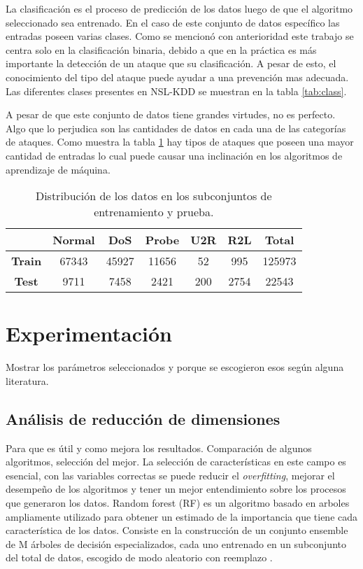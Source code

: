 La clasificación es el proceso de predicción de los datos luego de que el algoritmo seleccionado sea entrenado. En el caso de este conjunto de datos específico las entradas poseen varias clases. Como se mencionó con anterioridad este trabajo se centra solo en la clasificación binaria, debido a que en la práctica es más importante la detección de un ataque que su clasificación. A pesar de esto, el conocimiento del tipo del ataque puede ayudar a una prevención mas adecuada. Las diferentes clases presentes en NSL-KDD se muestran en la tabla \ref{tab:class}.


A pesar de que este conjunto de datos tiene grandes virtudes, no es perfecto. Algo que lo perjudica son las cantidades de datos en cada una de las categorías de ataques. Como muestra la tabla \ref{tab:atk_counts} hay tipos de ataques que poseen una mayor cantidad de entradas lo cual puede causar una inclinación en los algoritmos de aprendizaje de máquina.

\begin{table}[h]
    \begin{center}
        \caption{Distribución de los datos en los subconjuntos de entrenamiento y prueba.}
        
        \label{tab:atk_counts}
        \begin{tabular}{c|c|c|c|c|c|c} %
        \textbf{} & \textbf{Normal} & \textbf{DoS} & \textbf{Probe} & \textbf{U2R} & \textbf{R2L} & \textbf{Total}\\
        \hline
        \textbf{Train} & 67343 & 45927 & 11656 & 52 & 995 & 125973\\
        \textbf{Test} & 9711 & 7458 & 2421 & 200 & 2754 & 22543\\
        \end{tabular}
    \end{center}
\end{table}

\section{Experimentación}
Mostrar los parámetros seleccionados y porque se escogieron esos según alguna literatura.

\subsection{Análisis de reducción de dimensiones}
Para que es útil y como mejora los resultados. Comparación de algunos algoritmos, selección del mejor.
La selección de características en este campo es esencial, con las variables correctas se puede reducir el \textit{overfitting}, mejorar el desempeño de los algoritmos y tener un mejor entendimiento sobre los procesos que generaron los datos. Random forest (RF) es un algoritmo basado en arboles ampliamente utilizado para obtener un estimado de la importancia que tiene cada característica de los datos. Consiste en la construcción de un conjunto ensemble de M árboles de decisión especializados, cada uno entrenado en un subconjunto del total de datos, escogido de modo aleatorio con reemplazo \cite{hasan2016feature}.

